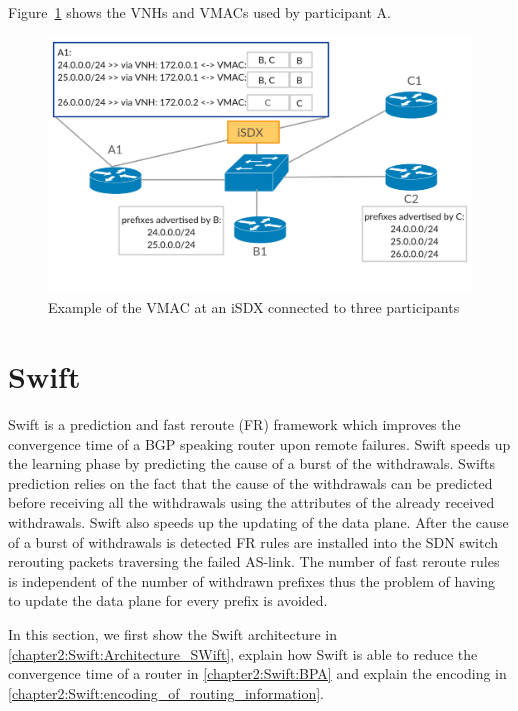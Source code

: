 Figure~\ref{fig:isdx_vmac} shows the VNHs and VMACs used by participant A.

\begin{figure}[h]
\center
\includegraphics[scale = 0.33]{Figures/sdx_vmac3.pdf}
\caption{Example of the VMAC at an iSDX connected to three participants}
\label{fig:isdx_vmac}
\end{figure}

\newpage

\section{\label{chapter2:Swift}Swift}

Swift is a prediction and fast reroute (FR) framework which improves the convergence time of a BGP speaking router upon remote failures. Swift speeds up the learning phase by predicting the cause of a burst of the withdrawals. Swifts prediction relies on the fact that the cause of the withdrawals can be predicted before receiving all the withdrawals using the attributes of the already received withdrawals. Swift also speeds up the updating of the data plane. After the cause of a burst of withdrawals is detected FR rules are installed into the SDN switch rerouting packets traversing the failed AS-link. The number of fast reroute rules is independent of the number of withdrawn prefixes thus the problem of having to update the data plane for every prefix is avoided. 

In this section, we first show the Swift architecture in \ref{chapter2:Swift:Architecture_SWift}, explain how Swift is able to reduce the convergence time of a router in \ref{chapter2:Swift:BPA} and explain the encoding in \ref{chapter2:Swift:encoding_of_routing_information}.

